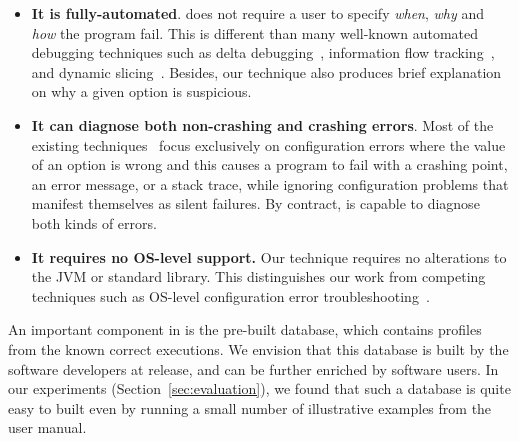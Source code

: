 \begin{itemize}
\item \textbf{It is fully-automated}.
\ourtool does not require a user to specify
\textit{when}, \textit{why} and \textit{how} the program fail. This is
different than many well-known automated debugging techniques such
as delta debugging~\cite{Zeller:2002:ICC}, information flow tracking~\cite{Attariyan:2010:ACT},
 and dynamic slicing~\cite{Zhang:2003:PDS}.
Besides, our technique also produces brief explanation on
why a given option is suspicious. 

\item \textbf{It can diagnose both non-crashing and crashing errors}.
Most of the existing techniques~\cite{Rabkin:2011:PPC,
Whitaker:2004:CDS, Attariyan:2010:ACT} focus exclusively on configuration errors
where the value of an option is wrong and this causes a program
to fail with a crashing point, an error message, or a stack trace, while
ignoring configuration problems that manifest themselves as
silent failures. By contract, \ourtool is capable to diagnose
both kinds of errors.

\item \textbf{It requires no OS-level support.} Our technique requires no alterations to
the JVM or standard library. This distinguishes our work from
competing techniques such as OS-level configuration
error troubleshooting~\cite{Whitaker:2004:CDS}.%

\end{itemize}

An important component in \ourtool is the pre-built
database, which contains profiles
from the known correct executions. We envision that this database is
built by the software developers at release, and can be
further enriched by software users. %
In our experiments (Section~\ref{sec:evaluation}), we
found that such a database is quite easy to built even by running
a small number of illustrative examples from the user manual.





